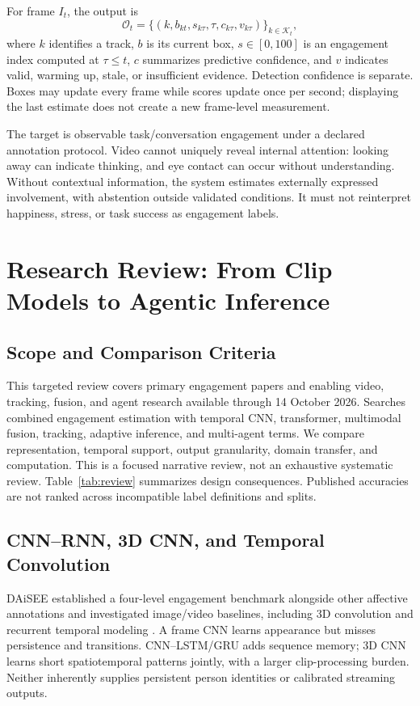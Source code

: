 \documentclass[a4paper,conference]{IEEEtran}
\begin{document}
For frame $I_t$, the output is
\begin{equation}
\mathcal{O}_t=\{(k,b_{kt},s_{k\tau},\tau,c_{k\tau},v_{k\tau})\}_{k\in\mathcal{K}_t},
\end{equation}
where $k$ identifies a track, $b$ is its current box, $s\in[0,100]$ is an engagement index computed at $\tau\le t$, $c$ summarizes predictive confidence, and $v$ indicates valid, warming up, stale, or insufficient evidence. Detection confidence is separate. Boxes may update every frame while scores update once per second; displaying the last estimate does not create a new frame-level measurement.

The target is observable task/conversation engagement under a declared annotation protocol. Video cannot uniquely reveal internal attention: looking away can indicate thinking, and eye contact can occur without understanding. Without contextual information, the system estimates externally expressed involvement, with abstention outside validated conditions. It must not reinterpret happiness, stress, or task success as engagement labels.

\section{Research Review: From Clip Models to Agentic Inference}
\subsection{Scope and Comparison Criteria}
This targeted review covers primary engagement papers and enabling video, tracking, fusion, and agent research available through 14 October 2026. Searches combined engagement estimation with temporal CNN, transformer, multimodal fusion, tracking, adaptive inference, and multi-agent terms. We compare representation, temporal support, output granularity, domain transfer, and computation. This is a focused narrative review, not an exhaustive systematic review. Table~\ref{tab:review} summarizes design consequences. Published accuracies are not ranked across incompatible label definitions and splits.

\subsection{CNN--RNN, 3D CNN, and Temporal Convolution}
DAiSEE established a four-level engagement benchmark alongside other affective annotations and investigated image/video baselines, including 3D convolution and recurrent temporal modeling \cite{daisee}. A frame CNN learns appearance but misses persistence and transitions. CNN--LSTM/GRU adds sequence memory; 3D CNN learns short spatiotemporal patterns jointly, with a larger clip-processing burden. Neither inherently supplies persistent person identities or calibrated streaming outputs.
\end{document}
